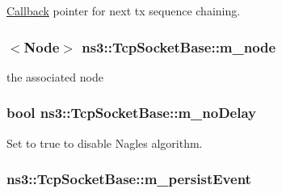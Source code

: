\hyperlink{classns3_1_1Callback}{Callback} pointer for next tx sequence chaining. 

\subsubsection[{\texorpdfstring{m\+\_\+node}{m_node}}]{$<${\bf Node}$>$ ns3\+::\+Tcp\+Socket\+Base\+::m\+\_\+node\hspace{0.3cm}{\ttfamily [protected]}}\hypertarget{classns3_1_1TcpSocketBase_abefd2b9f439fe5d0deef93ee68884a1e}{}\label{classns3_1_1TcpSocketBase_abefd2b9f439fe5d0deef93ee68884a1e}


the associated node 

\subsubsection[{\texorpdfstring{m\+\_\+no\+Delay}{m_noDelay}}]{\setlength{\rightskip}{0pt plus 5cm}bool ns3\+::\+Tcp\+Socket\+Base\+::m\+\_\+no\+Delay\hspace{0.3cm}{\ttfamily [protected]}}\hypertarget{classns3_1_1TcpSocketBase_ad358f0bbed41f6b13d474c49db493223}{}\label{classns3_1_1TcpSocketBase_ad358f0bbed41f6b13d474c49db493223}


Set to true to disable Nagle\textquotesingle{}s algorithm. 

\subsubsection[{\texorpdfstring{m\+\_\+persist\+Event}{m_persistEvent}}]{ ns3\+::\+Tcp\+Socket\+Base\+::m\+\_\+persist\+Event\hspace{0.3cm}{\ttfamily [protected]}}\hypertarget{classns3_1_1TcpSocketBase_ac9f9af0cce2ec51e89396146e3199b42}{}\label{classns3_1_1TcpSocketBase_ac9f9af0cce2ec51e89396146e3199b42}


